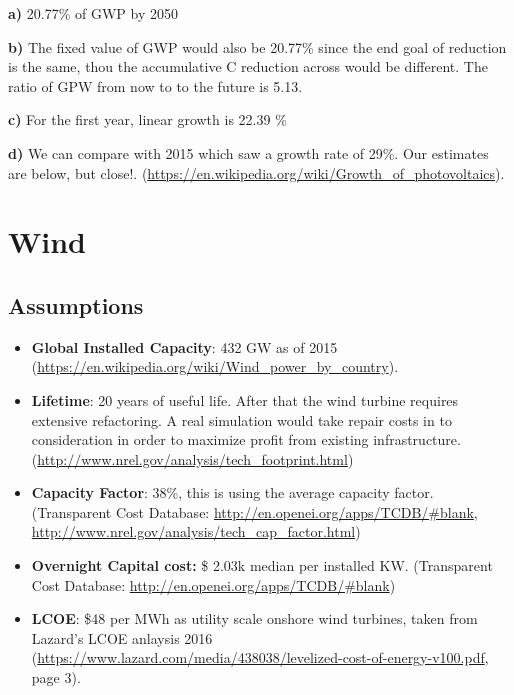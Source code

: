 \documentclass[11pt]{article}
\begin{document}
\colorbox{harvardcrimson!20}{ \textbf{a)}  } 20.77\% of GWP by 2050


\colorbox{harvardcrimson!20}{ \textbf{b)} } The fixed value of GWP would also be 20.77\% since the end goal of reduction is the same, thou the accumulative C reduction across would be different. The ratio of GPW from now to to the future is 5.13. 

\colorbox{harvardcrimson!20}{ \textbf{c)} }  For the first year, linear growth is 22.39 \%

\colorbox{harvardcrimson!20}{ \textbf{d)} } We can compare with 2015 which saw a growth rate of 29\%. Our estimates are below, but close!. (\url{https://en.wikipedia.org/wiki/Growth_of_photovoltaics}).

\section{Wind}

\subsection{Assumptions}
\begin{itemize}
\item \textbf{Global Installed Capacity}: 432 GW as of 2015 (\url{https://en.wikipedia.org/wiki/Wind_power_by_country}).
\item \textbf{Lifetime}: 20 years of useful life. After that the wind turbine requires extensive refactoring. A real simulation would take repair costs in to consideration in order to maximize profit from existing infrastructure.(\url{http://www.nrel.gov/analysis/tech_footprint.html})
\item \textbf{Capacity Factor}: 38\%, this is using the average capacity factor. (Transparent Cost Database: \url{http://en.openei.org/apps/TCDB/#blank}, \url{http://www.nrel.gov/analysis/tech_cap_factor.html})
\item \textbf{Overnight Capital cost:} \$ 2.03k median per installed KW. (Transparent Cost Database: \url{http://en.openei.org/apps/TCDB/#blank})
\item \textbf{LCOE}: \$48 per MWh  as utility scale onshore wind turbines, taken from Lazard's LCOE anlaysis 2016 (\url{https://www.lazard.com/media/438038/levelized-cost-of-energy-v100.pdf}, page 3).
\end{itemize}
\end{document}
